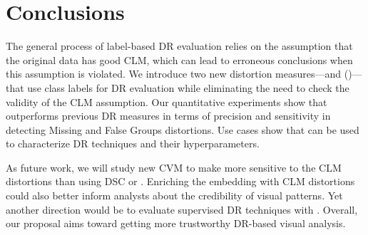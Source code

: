 \section{Conclusions}

The general process of label-based DR evaluation relies on the assumption that the original data has good CLM, which can lead to erroneous conclusions when this assumption is violated.
We introduce two new distortion measures---\LT and \LC  (\ltc)---that use class labels for DR evaluation while eliminating the need to check the validity of the CLM assumption. Our quantitative experiments show that \ltc outperforms previous DR measures in terms of precision and sensitivity in detecting Missing and False Groups distortions. Use cases show that \ltc can be used to characterize DR techniques and their hyperparameters.

As future work, we will study new CVM to make \ltc more sensitive to the CLM distortions than using DSC or \CHb. 
Enriching the embedding with CLM distortions \cite{lespinats11cgf} could also better inform analysts about the credibility of visual patterns. Yet another direction would be to evaluate supervised DR techniques with \ltc. 
Overall, our proposal aims toward getting more trustworthy DR-based visual analysis.